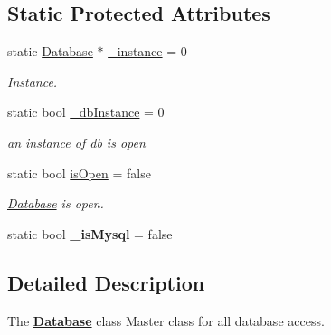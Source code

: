 \subsection*{Static Protected Attributes}
\begin{DoxyCompactItemize}
\item 
\hypertarget{classDatabases_1_1Database_a5f3ca7a29b769615feeac1c8b12f9a7e}{}static \hyperlink{classDatabases_1_1Database}{Database} $\ast$ \hyperlink{classDatabases_1_1Database_a5f3ca7a29b769615feeac1c8b12f9a7e}{\+\_\+instance} = 0\label{classDatabases_1_1Database_a5f3ca7a29b769615feeac1c8b12f9a7e}

\begin{DoxyCompactList}\small\item\em Instance. \end{DoxyCompactList}\item 
\hypertarget{classDatabases_1_1Database_a3bf8253398401fac46f74be67181877a}{}static bool \hyperlink{classDatabases_1_1Database_a3bf8253398401fac46f74be67181877a}{\+\_\+db\+Instance} = 0\label{classDatabases_1_1Database_a3bf8253398401fac46f74be67181877a}

\begin{DoxyCompactList}\small\item\em an instance of db is open \end{DoxyCompactList}\item 
\hypertarget{classDatabases_1_1Database_abdde0f6fbef7f4d7353acda867f01ca0}{}static bool \hyperlink{classDatabases_1_1Database_abdde0f6fbef7f4d7353acda867f01ca0}{is\+Open} = false\label{classDatabases_1_1Database_abdde0f6fbef7f4d7353acda867f01ca0}

\begin{DoxyCompactList}\small\item\em \hyperlink{classDatabases_1_1Database}{Database} is open. \end{DoxyCompactList}\item 
\hypertarget{classDatabases_1_1Database_a25138d7643dddc3b0fd587673fe84e7a}{}static bool {\bfseries \+\_\+is\+Mysql} = false\label{classDatabases_1_1Database_a25138d7643dddc3b0fd587673fe84e7a}

\end{DoxyCompactItemize}


\subsection{Detailed Description}
The {\bfseries \hyperlink{classDatabases_1_1Database}{Database}} class Master class for all database access. 

